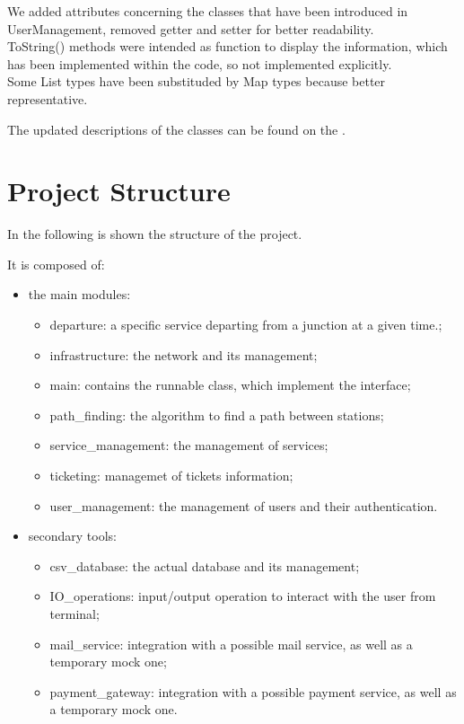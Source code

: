 We added attributes concerning the classes that have been introduced in UserManagement, removed getter and setter for better readability.\\
ToString() methods were intended as function to display the information, which has been implemented within the code, so not implemented explicitly.\\
Some List types have been substituded by Map types because better representative.

The updated descriptions of the classes can be found on the .

\newpage
\section{Project Structure}
In the following is shown the structure of the project.


It is composed of: 

\begin{itemize}

    \item the main modules:
    \begin{itemize}
        \item departure: a specific service departing from a junction at a given time.;
        \item infrastructure: the network and its management;
        \item main: contains the runnable class, which implement the interface;
        \item path\_finding: the algorithm to find a path between stations;
        \item service\_management: the management of services;
       \item ticketing: managemet of tickets information;
        \item user\_management: the management of users and their authentication.
    \end{itemize}

    \item secondary tools:
    \begin{itemize}
        \item csv\_database: the actual database and its management;
        \item IO\_operations: input/output operation to interact with the user from terminal;
        \item mail\_service: integration with a possible mail service, as well as a temporary mock one;
        \item payment\_gateway: integration with a possible payment service, as well as a temporary mock one.
    \end{itemize}
    
\end{itemize}

